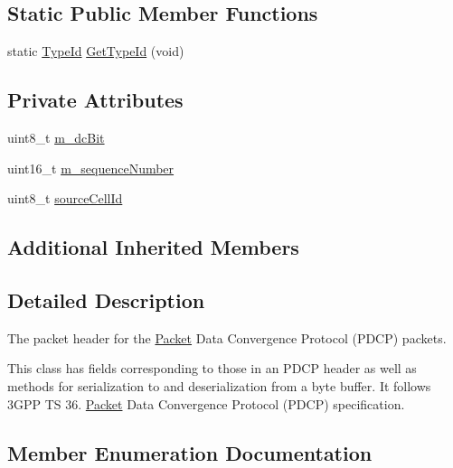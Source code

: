 \subsection*{Static Public Member Functions}
\begin{DoxyCompactItemize}
\item 
static \hyperlink{classns3_1_1TypeId}{Type\+Id} \hyperlink{classns3_1_1LtePdcpHeader_a9c3147120c5483bfc9afd4ce8fe43a84}{Get\+Type\+Id} (void)
\end{DoxyCompactItemize}
\subsection*{Private Attributes}
\begin{DoxyCompactItemize}
\item 
uint8\+\_\+t \hyperlink{classns3_1_1LtePdcpHeader_a31ed8b7d02fa64ce1337fc23d1377376}{m\+\_\+dc\+Bit}
\item 
uint16\+\_\+t \hyperlink{classns3_1_1LtePdcpHeader_a9302a2f08877e069a3d417721e898204}{m\+\_\+sequence\+Number}
\item 
uint8\+\_\+t \hyperlink{classns3_1_1LtePdcpHeader_a1a3e927f8d1a684a1453de72724ccf99}{source\+Cell\+Id}
\end{DoxyCompactItemize}
\subsection*{Additional Inherited Members}


\subsection{Detailed Description}
The packet header for the \hyperlink{classns3_1_1Packet}{Packet} Data Convergence Protocol (P\+D\+CP) packets. 

This class has fields corresponding to those in an P\+D\+CP header as well as methods for serialization to and deserialization from a byte buffer. It follows 3\+G\+PP TS 36. \hyperlink{classns3_1_1Packet}{Packet} Data Convergence Protocol (P\+D\+CP) specification. 

\subsection{Member Enumeration Documentation}
